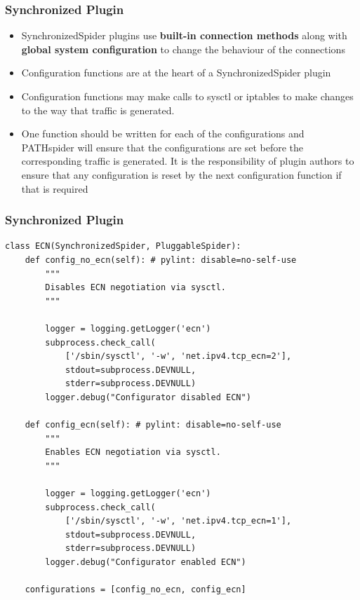 \documentclass{beamer}
\begin{document}

\begin{frame}
\frametitle{Synchronized Plugin}
\begin{itemize}
\item{SynchronizedSpider plugins use \textbf{built-in connection methods} along with
\textbf{global system configuration} to change the behaviour of the
connections}
\item{Configuration functions are at the heart of a SynchronizedSpider plugin}
\item{Configuration functions may make calls to sysctl or iptables to make
changes to the way that traffic is generated.}
\item{One function should be written for each of the configurations and PATHspider
will ensure that the configurations are set before the corresponding traffic is
generated. It is the responsibility of plugin authors to ensure that any
configuration is reset by the next configuration function if that is required}
\end{itemize}
\end{frame}

\begin{frame}[fragile]
\frametitle{Synchronized Plugin}
\begin{lstlisting}[caption={Configuration Functions for the ECN Plugin}]
class ECN(SynchronizedSpider, PluggableSpider):
    def config_no_ecn(self): # pylint: disable=no-self-use
        """
        Disables ECN negotiation via sysctl.
        """

        logger = logging.getLogger('ecn')
        subprocess.check_call(
            ['/sbin/sysctl', '-w', 'net.ipv4.tcp_ecn=2'],
            stdout=subprocess.DEVNULL,
            stderr=subprocess.DEVNULL)
        logger.debug("Configurator disabled ECN")

    def config_ecn(self): # pylint: disable=no-self-use
        """
        Enables ECN negotiation via sysctl.
        """

        logger = logging.getLogger('ecn')
        subprocess.check_call(
            ['/sbin/sysctl', '-w', 'net.ipv4.tcp_ecn=1'],
            stdout=subprocess.DEVNULL,
            stderr=subprocess.DEVNULL)
        logger.debug("Configurator enabled ECN")

    configurations = [config_no_ecn, config_ecn]
\end{lstlisting}
\end{frame}
\end{document}
